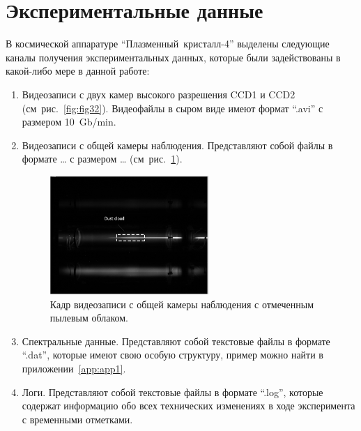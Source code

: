 \section{Экспериментальные данные}
\label{cha:ch_3_4}
В космической аппаратуре “Плазменный~кристалл-4” выделены следующие каналы получения экспериментальных данных,
которые были задействованы в какой-либо мере в данной работе:
\begin{enumerate}
    \item Видеозаписи с двух камер высокого разрешения CCD1 и CCD2 (см~рис.~\ref{fig:fig32}).
    Видеофайлы в сыром виде имеют формат “.avi” с размером 10~Gb/min.

    \item Видеозаписи с общей камеры наблюдения. Представляют собой файлы в формате … с размером … (см~рис.~\ref{fig:fig33}).
    \begin{figure}[t]
      \centering
      \includegraphics[width=6cm]{figures/fig33}
      \caption{Кадр видеозаписи с общей камеры наблюдения с отмеченным пылевым облаком.}
      \label{fig:fig33}
    \end{figure}

    \item Спектральные данные. Представляют собой текстовые файлы в формате “.dat”,
    которые имеют свою особую структуру, пример можно найти в приложении~\ref{app:app1}.


    \item Логи. Представляют собой текстовые файлы в формате “.log”, которые содержат информацию обо всех
    технических изменениях в ходе эксперимента с временными отметками.


\end{enumerate}
